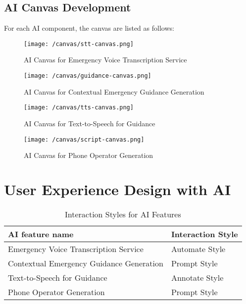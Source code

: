 \subsection{AI Canvas Development}
\label{subsec:ai_canvas}
For each AI component, the canvas are listed as follows: %

\begin{figure}[htbp] %
    \centering
    \texttt{[image: /canvas/stt-canvas.png]}
    \caption{AI Canvas for Emergency Voice Transcription Service}
    \label{fig:stt-canvas} %
\end{figure}

\begin{figure}[htbp] %
    \centering
    \texttt{[image: /canvas/guidance-canvas.png]}
    \caption{AI Canvas for Contextual Emergency Guidance Generation}
    \label{fig:guidance-canvas}
\end{figure}

\begin{figure}[htbp] %
    \centering
    \texttt{[image: /canvas/tts-canvas.png]}
    \caption{AI Canvas for Text-to-Speech for Guidance}
    \label{fig:tts-canvas}
\end{figure}

\begin{figure}[htbp] %
    \centering
    \texttt{[image: /canvas/script-canvas.png]}
    \caption{AI Canvas for Phone Operator Generation}
    \label{fig:script-canvas}
\end{figure}

\newpage
\section{User Experience Design with AI}
\label{sec:user_experience_design_ai}

\begin{table}[h!]
\centering
\caption{Interaction Styles for AI Features}
\label{tab:interaction_styles}
\begin{tabular}{|l|l|}
\hline
\textbf{AI feature name} & \textbf{Interaction Style} \\
\hline
Emergency Voice Transcription Service & Automate Style \\
\hline
Contextual Emergency Guidance Generation & Prompt Style \\
\hline
Text-to-Speech for Guidance & Annotate Style \\
\hline
Phone Operator Generation & Prompt Style \\
\hline
\end{tabular}
\end{table}

